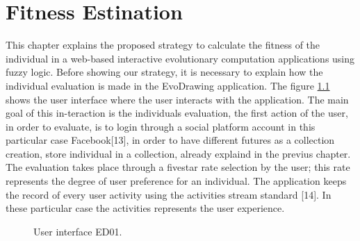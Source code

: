 \chapter{Fitness Estination}

This chapter explains the proposed strategy to calculate the fitness of the
individual in a web-based interactive evolutionary computation applications
using fuzzy logic. Before showing our strategy, it is necessary to explain how
the individual evaluation is made in the EvoDrawing application. The figure
\ref{fig:UI_ED} shows the user interface where the user interacts with the
application. The main goal of this in-teraction is the individuals evaluation,
the first action of the user, in order to evaluate, is to login through a social
platform account in this particular case Facebook[13], in order to have
different futures as a collection creation, store individual in a collection,
already explaind in the previus chapter. The evaluation takes place through a
fivestar rate selection by the user; this rate represents the degree of user
preference for an individual. The application keeps the record of every user
activity using the activities stream standard [14]. In these particular case the
activities represents the user experience.

\begin{figure}
\captionsetup{justification=centering,margin=2cm}
\centering
\setlength\fboxsep{0pt}
\setlength\fboxrule{0.7pt}
\caption{User interface ED01.}
\label{fig:UI_ED}
\end{figure}

